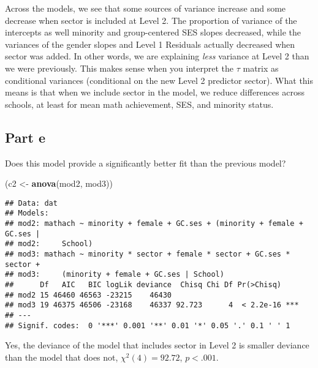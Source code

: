 \documentclass[]{article}
\newenvironment{Shaded}{\begin{snugshade}}{\end{snugshade}}
\newcommand{\KeywordTok}[1]{\textcolor[rgb]{0.13,0.29,0.53}{\textbf{#1}}}
\newcommand{\StringTok}[1]{\textcolor[rgb]{0.31,0.60,0.02}{#1}}
\newcommand{\NormalTok}[1]{#1}
\begin{document}
Across the models, we see that some sources of variance increase and
some decrease when sector is included at Level 2. The proportion of
variance of the intercepts as well minority and group-centered SES
slopes decreased, while the variances of the gender slopes and Level 1
Residuals actually decreased when sector was added. In other words, we
are explaining \emph{less} variance at Level 2 than we were previously.
This makes sense when you interpret the \(\tau\) matrix as conditional
variances (conditional on the new Level 2 predictor sector). What this
means is that when we include sector in the model, we reduce differences
across schools, at least for mean math achievement, SES, and minority
status.

\subsection{Part e}\label{part-e-1}

Does this model provide a significantly better fit than the previous
model?

\begin{Shaded}
\begin{Highlighting}[]
\NormalTok{(c2 <-}\StringTok{ }\KeywordTok{anova}\NormalTok{(mod2, mod3))}
\end{Highlighting}
\end{Shaded}

\begin{verbatim}
## Data: dat
## Models:
## mod2: mathach ~ minority + female + GC.ses + (minority + female + GC.ses | 
## mod2:     School)
## mod3: mathach ~ minority * sector + female * sector + GC.ses * sector + 
## mod3:     (minority + female + GC.ses | School)
##      Df   AIC   BIC logLik deviance  Chisq Chi Df Pr(>Chisq)    
## mod2 15 46460 46563 -23215    46430                             
## mod3 19 46375 46506 -23168    46337 92.723      4  < 2.2e-16 ***
## ---
## Signif. codes:  0 '***' 0.001 '**' 0.01 '*' 0.05 '.' 0.1 ' ' 1
\end{verbatim}

Yes, the deviance of the model that includes sector in Level 2 is
smaller deviance than the model that does not, \(\chi^2(4) = 92.72\),
\(p<.001\).
\end{document}
